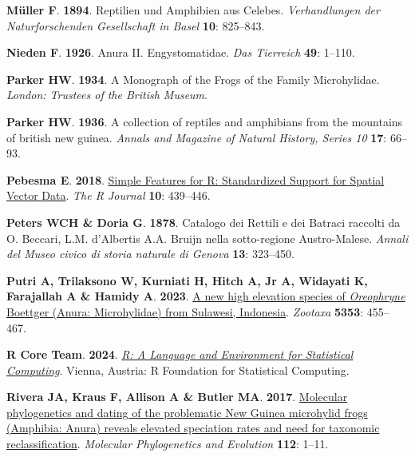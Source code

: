 \documentclass[
  letterpaper,
  DIV=11,
  numbers=noendperiod]{scrartcl}
\newlength{\cslhangindent}
\newenvironment{CSLReferences}[2] %
 {\begin{list}{}{%
  \setlength{\itemindent}{0pt}
  \setlength{\leftmargin}{0pt}
  \setlength{\parsep}{0pt}
  \ifodd #1
   \setlength{\leftmargin}{\cslhangindent}
   \setlength{\itemindent}{-1\cslhangindent}
  \fi
  \setlength{\itemsep}{#2\baselineskip}}}
 {\end{list}}
\begin{document}
\begin{CSLReferences}{0}{1}
\textbf{\textbf{Müller F}}. \textbf{1894}. {Reptilien und Amphibien aus
Celebes}. \emph{Verhandlungen der Naturforschenden Gesellschaft in
Basel} \textbf{10}: 825--843.

\textbf{\textbf{Nieden F}}. \textbf{1926}. {Anura II. Engystomatidae}.
\emph{Das Tierreich} \textbf{49}: 1--110.

\textbf{\textbf{Parker HW}}. \textbf{1934}. {A Monograph of the Frogs of
the Family Microhylidae}. \emph{London: Trustees of the British Museum}.

\textbf{\textbf{Parker HW}}. \textbf{1936}. A collection of reptiles and
amphibians from the mountains of british new guinea. \emph{Annals and
Magazine of Natural History, Series 10} \textbf{17}: 66--93.

\textbf{\textbf{Pebesma E}}. \textbf{2018}.
\href{https://doi.org/10.32614/RJ-2018-009}{{Simple Features for R:
Standardized Support for Spatial Vector Data}}. \emph{{The R Journal}}
\textbf{10}: 439--446.

\textbf{\textbf{Peters WCH} \& \textbf{Doria G}}. \textbf{1878}.
{Catalogo dei Rettili e dei Batraci raccolti da O. Beccari, L.M.
d'Albertis A.A. Bruijn nella sotto-regione Austro-Malese}. \emph{Annali
del Museo civico di storia naturale di Genova} \textbf{13}: 323--450.

\textbf{\textbf{Putri A}, \textbf{Trilaksono W}, \textbf{Kurniati H},
\textbf{Hitch A}, \textbf{Jr A}, \textbf{Widayati K}, \textbf{Farajallah
A} \& \textbf{Hamidy A}}. \textbf{2023}.
\href{https://doi.org/10.11646/zootaxa.5353.5.4}{{A new high elevation
species of \emph{Oreophryne} Boettger (Anura: Microhylidae) from
Sulawesi, Indonesia}}. \emph{Zootaxa} \textbf{5353}: 455--467.

\textbf{\textbf{R Core Team}}. \textbf{2024}.
\emph{\href{https://www.R-project.org/}{{R: A Language and Environment
for Statistical Computing}}}. Vienna, Austria: R Foundation for
Statistical Computing.

\textbf{\textbf{Rivera JA}, \textbf{Kraus F}, \textbf{Allison A} \&
\textbf{Butler MA}}. \textbf{2017}.
\href{https://doi.org/10.1016/j.ympev.2017.04.008}{{Molecular
phylogenetics and dating of the problematic New Guinea microhylid frogs
(Amphibia: Anura) reveals elevated speciation rates and need for
taxonomic reclassification}}. \emph{Molecular Phylogenetics and
Evolution} \textbf{112}: 1--11.


\end{CSLReferences}
\end{document}
